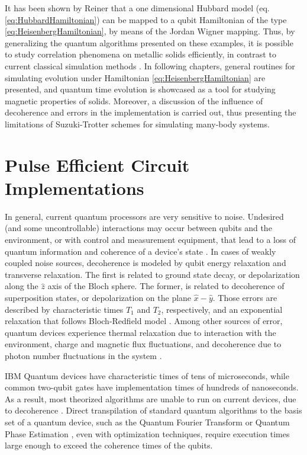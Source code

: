   It has been shown by Reiner \cite{Mastersthesis} that a one dimensional Hubbard model (eq. \ref{eq:HubbardHamiltonian}) can be mapped to a qubit Hamiltonian of the type \ref{eq:HeisenbergHamiltonian}, by means of the Jordan Wigner mapping. Thus, by generalizing the quantum algorithms presented on these examples, it is possible to study correlation phenomena on metallic solids efficiently, in contrast to current classical simulation methods \cite{Mastersthesis,HubbardOriginal}. In following chapters,  general routines for simulating evolution under Hamiltonian \ref{eq:HeisenbergHamiltonian} are presented, and quantum time evolution is showcased as a tool for studying magnetic properties of solids. Moreover, a discussion of the influence of decoherence and errors in the implementation is carried out, thus presenting the limitations of Suzuki-Trotter schemes for simulating many-body systems.

  

\section{Pulse Efficient Circuit Implementations}
\label{sec:pulseFunda}

  In general, current quantum processors are very sensitive to noise. Undesired (and some uncontrollable) interactions may occur between qubits and the environment, or with control and measurement equipment, that lead to a loss of quantum information and coherence of a device's state \cite{quantumEngineer}. In cases of weakly coupled noise sources, decoherence is modeled by qubit energy relaxation and transverse relaxation. The first is related to ground state decay, or depolarization along the $\hat{z}$ axis of the Bloch sphere. The former, is related to decoherence of superposition states, or depolarization on the plane $\hat{x}-\hat{y}$. Those errors are described by characteristic times $T_1$ and $T_2$, respectively, and an exponential relaxation that follows Bloch-Redfield model \cite{quantumEngineer}. Among other sources of error, quantum devices experience thermal relaxation due to interaction with the environment, charge and magnetic flux fluctuations, and decoherence due to photon number fluctuations in the system \cite{quantumEngineer}. 
  
  IBM Quantum devices have characteristic times of tens of microseconds, while common two-qubit gates have implementation times of hundreds of nanoseconds. As a result, most theorized algorithms are unable to run on current devices, due to decoherence \cite{MajoranaSimulation, RXZPulseEfficient, QuantumChem2, QuantumChem1}. Direct transpilation of standard quantum algorithms to the basis set of a quantum device, such as the Quantum Fourier Transform or Quantum Phase Estimation \cite{Nielsen}, even with optimization techniques, require execution times large enough to exceed the coherence times of the qubits.

